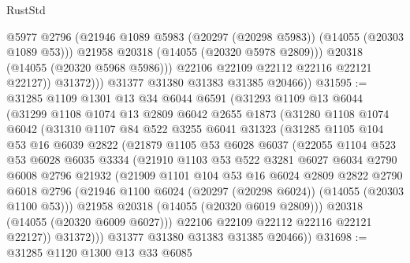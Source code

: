 \begin{lexlean}{RustStd}
\begin{coremodule}
                      @5977
                      @2796
                      (@21946 @1089 @5983 (@20297 (@20298 @5983)) (@14055 (@20303 @1089 @53)))
                      @21958
                      @20318
                      (@14055 (@20320 @5978 @2809)))
                    @20318
                    (@14055 (@20320 @5968 @5986)))
                  @22106
                  @22109
                  @22112
                  @22116
                  @22121
                  @22127))
              @31372)))
        @31377
        @31380
        @31383
        @31385
        @20466))
@31595 := @31285
    @1109
    @1301
    @13
    @34
    @6044
    @6591
    (@31293
      @1109
      @13
      @6044
      (@31299
        @1108
        @1074
        @13
        @2809
        @6042
        @2655
        @1873
        (@31280
          @1108
          @1074
          @6042
          (@31310
            @1107
            @84
            @522
            @3255
            @6041
            @31323
            (@31285
              @1105
              @104
              @53
              @16
              @6039
              @2822
              (@21879
                @1105
                @53
                @6028
                @6037
                (@22055
                  @1104
                  @523
                  @53
                  @6028
                  @6035
                  @3334
                  (@21910
                    @1103
                    @53
                    @522
                    @3281
                    @6027
                    @6034
                    @2790
                    @6008
                    @2796
                    @21932
                    (@21909
                      @1101
                      @104
                      @53
                      @16
                      @6024
                      @2809
                      @2822
                      @2790
                      @6018
                      @2796
                      (@21946 @1100 @6024 (@20297 (@20298 @6024)) (@14055 (@20303 @1100 @53)))
                      @21958
                      @20318
                      (@14055 (@20320 @6019 @2809)))
                    @20318
                    (@14055 (@20320 @6009 @6027)))
                  @22106
                  @22109
                  @22112
                  @22116
                  @22121
                  @22127))
              @31372)))
        @31377
        @31380
        @31383
        @31385
        @20466))
@31698 := @31285
    @1120
    @1300
    @13
    @33
    @6085

\end{coremodule}
\end{lexlean}
